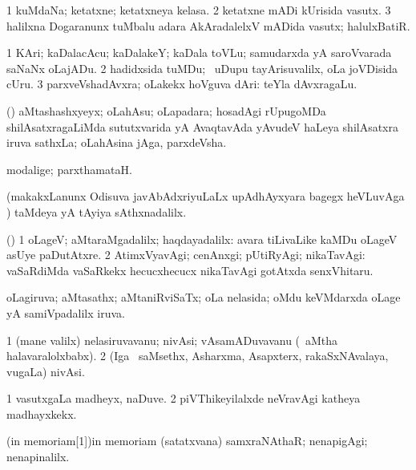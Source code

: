 \bentry
{}
\gl{\nA}
\bmng
\bnum
\num{1} kuMdaNa; ketatxne; ketatxneya kelasa. 
\num{2} ketatxne mADi kUrisida vasutx. 
\num{3} halilxna Dogaranunx tuMbalu adara AkAradalelxV mADida vasutx; halulxBatiR. 
\enum
\emng
\eentry

\bentry
{}
\gl{\nA}
\bmng
\bnum
\num{1} KAri; kaDalacAcu; kaDalakeY; kaDala toVLu; samudarxda yA saroVvarada saNaNx oLajADu. 
\num{2} hadidxsida tuMDu; \kanmu\ uDupu tayArisuvalilx, oLa joVDisida cUru. 
\num{3} parxveVshadAvxra; oLakekx hoVguva dAri:  teYla dAvxragaLu. 
\enum
\emng
\eentry

\bentry
{}
\gl{\nA}
\bmng
(\BUvi) aMtashashxyeyx; oLahAsu; oLapadara; hosadAgi rUpugoMDa shilAsatxragaLiMda sututxvarida yA AvaqtavAda yAvudeV haLeya shilAsatxra iruva sathxLa; oLahAsina jAga, parxdeVsha. 
\emng
\eentry

\bentry
{}
\gl{\kirxvi}
\expl{\Latin}
\bmng
 modalige; parxthamataH. 
\emng
\eentry

\bentry
{}
\gl{\kirxvi}
\expl{\Latin }
\bmng
(makakxLanunx Odisuva javAbAdxriyuLaLx upAdhAyxyara bagegx heVLuvAga \parx) taMdeya yA tAyiya sAthxnadalilx. 
\emng
\eentry

\bentry
{}
\gl{\kirxvi}
\bmng
(\kAparx) 
\bnum
\num{1} oLageV; aMtaraMgadalilx; haqdayadalilx:  avara tiLivaLike kaMDu oLageV asUye paDutAtxre. 
\num{2} AtimxVyavAgi; cenAnxgi; pUtiRyAgi; nikaTavAgi:  vaSaRdiMda vaSaRkekx hecucxhecucx nikaTavAgi gotAtxda senxVhitaru. 
\enum
\emng
\eentry

\bentry
{}
\gl{\gu}
\bmng
oLagiruva; aMtasathx; aMtaniRviSaTx; oLa nelasida; oMdu keVMdarxda oLage yA samiVpadalilx iruva. 
\emng
\eentry

\bentry
{}
\gl{\nA}
\bmng
\bnum
\num{1} (mane \mo valilx) nelasiruvavanu; nivAsi; vAsamADuvavanu (\kanmu\ aMtha halavaralolxbabx). 
\num{2} (Iga \sA\ saMsethx, Asharxma, Asapxterx, rakaSxNAvalaya, \mo vugaLa) nivAsi. 
\enum
\emng
\eentry

\bentry
{}
\gl{\kirxvi}
\expl{\Latin}
\bmng
\bnum
\num{1} vasutxgaLa madheyx, naDuve. 
\num{2} piVThikeyilalxde neVravAgi katheya madhayxkekx. 
\enum
\emng
\eentry

\bentry
\wordf(in memoriam[1]){in memoriam}
\gl{\upa}
\expl{\Latin }
\bmng
(satatxvana) samxraNAthaR; nenapigAgi; nenapinalilx. 
\emng
\eentry

